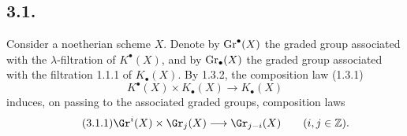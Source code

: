 \subsection*{3.1.}
Consider a noetherian scheme \(X\). Denote by \(\operatorname{Gr}^{\bullet}(X)\) the graded group associated with the \(\lambda\)-filtration of \(K^{\bullet}(X)\), and by \(\operatorname{Gr}_{\bullet}(X)\) the graded group associated with the filtration 1.1.1 of \(K_\bullet(X)\). By 1.3.2, the composition law (1.3.1)
\[
 K^{\bullet}(X)\times K_\bullet(X)\longrightarrow K_\bullet(X)
\]
induces, on passing to the associated graded groups, composition laws
\begin{equation}\tag{3.1.1}
 \Gr^i(X)\times\Gr_j(X)\longrightarrow \Gr_{j-i}(X)\qquad(i,j\in\mathbb Z).
\end{equation}

